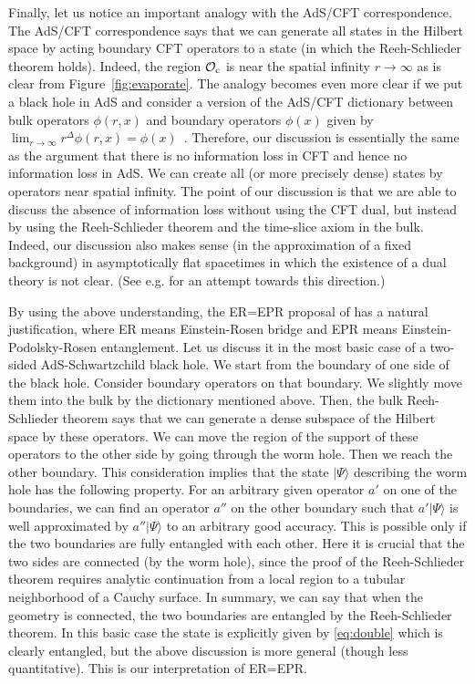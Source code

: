 \documentclass[12pt,a4paper]{article}
\theoremstyle{plain}
\theoremstyle{definition}
\numberwithin{thm}{section}
\newcommand{\ket}[1]{ | {#1} \rangle }
\def\CO{{\cal O}}
\begin{document}
Finally, let us notice an important analogy with the AdS/CFT correspondence.
The AdS/CFT correspondence says that we can generate all states in the Hilbert space by acting boundary CFT operators to a state (in which the Reeh-Schlieder theorem holds).
Indeed, the region $\CO_{\rm c}$ is near the spatial infinity $r \to \infty$ as is clear from Figure~\ref{fig:evaporate}.
The analogy becomes even more clear if we put a black hole in AdS and consider a version of the AdS/CFT dictionary between bulk operators $\phi(r,x)$ and boundary operators $\phi(x)$
given by $\lim_{r \to \infty} r^\Delta \phi(r,x) = \phi(x)$~\cite{Banks:1998dd,Harlow:2011ke}.
Therefore, our discussion is essentially the same as the argument that there is no information loss in CFT and hence no information loss in AdS.
We can create all (or more precisely dense) states by operators near spatial infinity. 
The point of our discussion is that we are able to discuss the absence of information loss without using the CFT dual,
but instead by using the Reeh-Schlieder theorem and the time-slice axiom in the bulk. Indeed, our discussion also makes sense (in the approximation of a fixed background) in asymptotically flat spacetimes in which
the existence of a dual theory is not clear. (See e.g. \cite{Nomura:2016ikr} for an attempt towards this direction.)

By using the above understanding, the ER=EPR proposal of \cite{Maldacena:2013xja} has a natural justification,
where ER means Einstein-Rosen bridge and EPR means Einstein-Podolsky-Rosen entanglement. 
Let us discuss it in the most basic case of a two-sided AdS-Schwartzchild black hole.
We start from the boundary of one side of the black hole. Consider boundary operators on that boundary. We slightly move them into the bulk by the dictionary mentioned above.
Then, the bulk Reeh-Schlieder theorem says that we can generate a dense subspace of the Hilbert space by these operators. We can move the region of the support of these operators
to the other side by going through the worm hole. Then we reach the other boundary. This consideration implies that the state $\ket{\Psi}$ describing the worm hole
has the following property. For an arbitrary given operator $a'$ on one of the boundaries, we can find an operator $a''$ on the other boundary
such that $a'\ket{\Psi}$ is well approximated by $a''\ket{\Psi}$ to an arbitrary good accuracy. This is possible only if the two boundaries are fully entangled with each other.
Here it is crucial that the two sides are connected (by the worm hole), since the proof of the Reeh-Schlieder theorem requires analytic continuation from a local region to a tubular neighborhood of a Cauchy surface.
In summary, we can say that when the geometry is connected, the two boundaries are entangled by the Reeh-Schlieder theorem. In this basic case
the state is explicitly given by \eqref{eq:double} which is clearly entangled, but the above discussion is more general (though less quantitative).
This is our interpretation of ER=EPR. 
\end{document}
